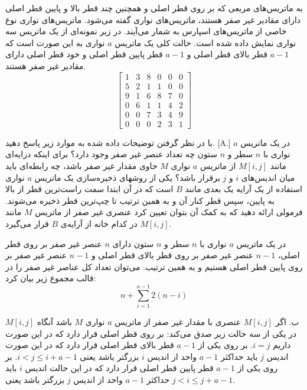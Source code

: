  به ماتریس‌های مربعی که بر روی قطر اصلی و همچنین چند قطر بالا و پایین قطر اصلی دارای مقادیر غیر صفر هستند، ماتریس‌های نواری گفته می‌شود. ماتریس‌های نواری نوع خاصی از ماتریس‌های اسپارس به شمار می‌آیند. در زیر نمونه‌ای از یک ماتریس سه نواری نمایش داده شده است. حالت کلی یک ماتریس‌ {$a$} نواری به این صورت است که {$a-1$} قطر بالای قطر اصلی و {$a-1$} قطر پایین قطر اصلی و خود قطر اصلی دارای مقادیر غیر صفر هستند. 
$$
\begin{bmatrix}
1 & 3 & 8 & 0 & 0 & 0\\
5 & 2 & 1 & 1 & 0 & 0\\
9 & 1 & 6 & 8 & 7 & 0\\
0 & 6 & 1 & 1 & 4 & 2\\
0 & 0 & 7 & 3 & 4 & 9\\
0 & 0 & 0 & 2 & 3 & 1
\end{bmatrix}
$$

با در نظر گرفتن توضیحات داده شده به موارد زیر پاسخ دهید.
[A.]
 در یک ماتریس {$a$} نواری با {$n$} سطر و {$n$} ستون چه تعداد عنصر غیر صفر وجود دارد؟
 برای اینکه درایه‌ای مانند {$M[i,j]$} از ماتریس {$a$} نواری {$M$} حاوی مقدار غیر صفر باشد، چه رابطه‌ای باید میان اندیس‌های {$i$} و {$j$} برقرار باشد؟ 
 یکی از روشهای ذخیره‌سازی یک ماتریس {$a$} نواری استفاده از یک آرایه یک بعدی مانند {$B$} است که در آن ابتدا سمت راست‌ترین قطر از بالا به پایین، سپس قطر کنار آن و به همین ترتیب تا چپ‌ترین قطر ذخیره می‌شوند. فرمولی ارائه دهید که به کمک آن بتوان تعیین کرد عنصری غیر صفر از ماتریس {$M$} مانند {$M[i,j]$} در کدام خانه از آرایه‌ی {$B$} قرار می‌گیرد.


در یک ماتریس {$a$} نواری با {$n$} سطر و {$n$} ستون دارای {$n$} عنصر غیر صفر بر روی قطر اصلی، {$n-1$} عنصر غیر صفر بر روی قطر بالای قطر اصلی و {$n-1$} عنصر غیر صفر بر روی پایین قطر اصلی هستیم و به همین ترتیب. می‌توان تعداد کل عناصر غیر صفر را در قالب مجموع زیر بیان کرد:
\begin{displaymath}
n+\sum_{i=1}^{a-1}{2(n-i)}
\end{displaymath}

ب. اگر {$M[i,j]$} عنصری با مقدار غیر صفر از ماتریس {$a$} نواری {$M$} باشد آنگاه {$M[i,j]$} در یکی از سه حالت زیر صدق می‌کند:
 بر روی قطر اصلی قرار دارد که در این صورت داریم {$i=j$}.
 بر روی یکی از {$a-1$} قطر بالای قطر اصلی قرار دارد که در این صورت اندیس {$j$} باید حداکثر {$a-1$} واحد از اندیس {$i$} بزرگتر باشد یعنی {$i<j\leq i+a-1$}.
 بر روی یکی از {$a-1$} قطر پایین قطر اصلی قرار دارد که در این حالت اندیس {$i$} باید حداکثر {$a-1$} واحد از اندیس {$j$} بزرگتر باشد یعنی {$j<i\leq j+a-1$}.

